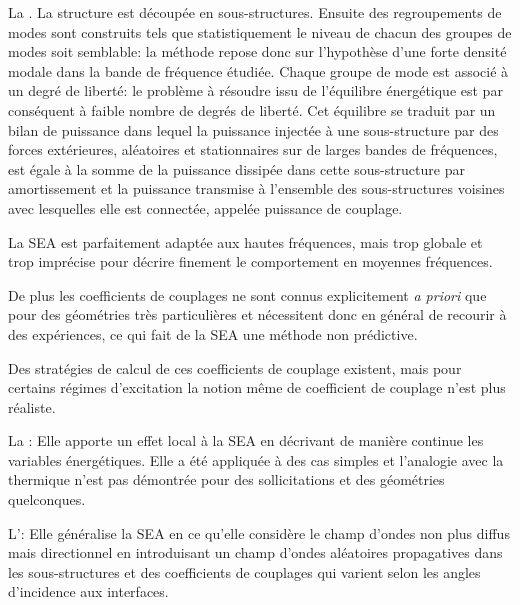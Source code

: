 \bigskip
La . La structure est découpée en sous-structures. Ensuite des regroupements de modes sont construits tels que statistiquement le niveau de chacun des groupes de modes soit semblable: la méthode repose donc sur l'hypothèse d'une forte densité modale dans la bande de fréquence étudiée. Chaque groupe de mode est associé à un degré de liberté: le problème à résoudre issu de l'équilibre énergétique est par conséquent à faible nombre de degrés de liberté. Cet équilibre se traduit par un bilan de puissance dans lequel la puissance injectée à une sous-structure par des forces extérieures, aléatoires et stationnaires sur de larges bandes de fréquences, est égale à la somme de la puissance dissipée dans cette sous-structure par amortissement et la puissance transmise à l'ensemble des sous-structures voisines avec lesquelles elle est connectée, appelée puissance de couplage. 

La SEA est parfaitement adaptée aux hautes fréquences, mais trop globale et trop imprécise pour décrire finement le comportement en moyennes fréquences.

De plus les coefficients de couplages ne sont connus explicitement \emph{a priori} que pour des géométries très particulières et nécessitent donc en général de recourir à des expériences, ce qui fait de la SEA une méthode non prédictive.

Des stratégies de calcul de ces coefficients de couplage existent, mais pour certains régimes d'excitation la notion même de coefficient de couplage n'est plus réaliste.

\bigskip
La : Elle apporte un effet local à la SEA en décrivant de manière continue les variables énergétiques. Elle a été appliquée à des cas simples et l'analogie avec la thermique n'est pas démontrée pour des sollicitations et des géométries quelconques. 

\bigskip
L': Elle généralise la SEA en ce qu'elle considère le champ d'ondes non plus diffus mais directionnel en introduisant un champ d'ondes aléatoires propagatives dans les sous-structures et des coefficients de couplages qui varient selon les angles
d'incidence aux interfaces.


